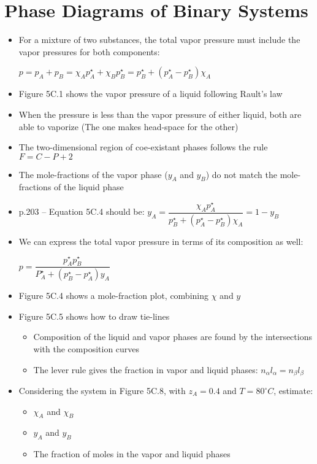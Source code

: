 \documentclass[12pt, openany, letterpaper]{memoir}
\begin{document}
\section{Phase Diagrams of Binary Systems}
\begin{itemize}
	\item For a mixture of two substances, the total vapor pressure must include the vapor pressures for both components:
	
	$p = p_A+p_B=\chi_Ap^\star_A+\chi_Bp^\star_B=p^\star_B+\left(p^\star_A-p^\star_B\right)\chi_A$
	\item Figure 5C.1 shows the vapor pressure of a liquid following Rault's law
	\item When the pressure is less than the vapor pressure of either liquid, both are able to vaporize (The one makes head-space for the other)
	\item The two-dimensional region of coe-existant phases follows the rule $F = C - P + 2$
	\item The mole-fractions of the vapor phase ($y_A$ and $y_B$) do not match the mole-fractions of the liquid phase
	\item p.203 -- Equation 5C.4 should be: $y_A = \dfrac{\chi_Ap^\star_A}{p^\star_B+\left(p^\star_A-p^\star_B\right)\chi_A} = 1-y_B$
	\item We can express the total vapor pressure in terms of its composition as well:
	
	$p = \dfrac{p^\star_Ap_B^\star}{P_A^\star+\left(p^\star_B-p^\star_A\right)y_A}$
	\item Figure 5C.4 shows a mole-fraction plot, combining $\chi$ and $y$
	\item Figure 5C.5 shows how to draw tie-lines
	\begin{itemize}
		\item Composition of the liquid and vapor phases are found by the intersections with the composition curves
		\item The lever rule gives the fraction in vapor and liquid phases: $n_\alpha l_\alpha=n_\beta l_\beta$
	\end{itemize}
	\item Considering the system in Figure 5C.8, with $z_A = 0.4$ and $T=80^\circ C$, estimate:
	\begin{itemize}
		\item $\chi_A$ and $\chi_B$
		\item $y_A$ and $y_B$
		\item The fraction of moles in the vapor and liquid phases
	\end{itemize}
\end{itemize}
\end{document}
